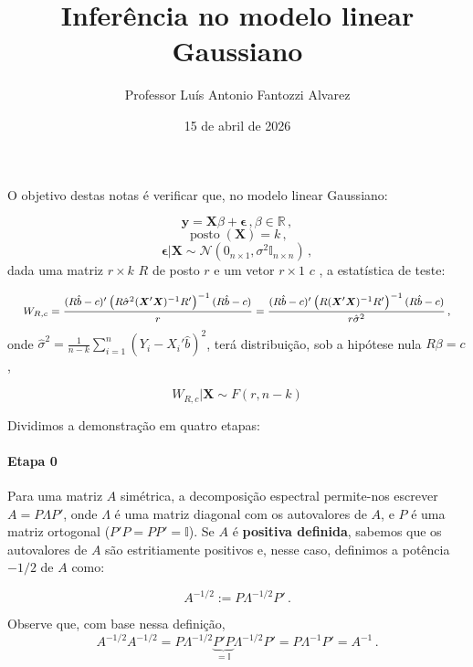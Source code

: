 \documentclass[12pt,a4paper]{article}
\title{Inferência no modelo linear Gaussiano}
\author{ Professor Luís Antonio Fantozzi Alvarez}
\date{15 de abril de 2026}
\begin{document}
	\maketitle
	O objetivo destas notas é verificar que, no modelo linear Gaussiano:
	
	$$\boldsymbol{y} = \boldsymbol{X}\beta + \boldsymbol{\epsilon}\, ,  \beta \in \mathbb{R}\, ,$$
	$$\operatorname{posto}(\boldsymbol{X}) = k\, ,$$
	$$\boldsymbol{\epsilon}|\boldsymbol{X} \sim \mathcal{N}(0_{n\times 1},\sigma^2 \mathbb{I}_{n\times n})\, ,$$
	dada uma matriz $r \times k$ $R$ de posto $r$ e um vetor $r\times 1$ $c$ , a estatística de teste:
	
	$$\footnotesize W_{R,c} = \frac{(R\hat{b}-c)'\left(R\hat{\sigma}^2(\boldsymbol{X}'\boldsymbol{X})^{-1}R'\right)^{-1}(R\hat{b}-c)}{r}  = \frac{(R\hat{b}-c)'\left(R(\boldsymbol{X}'\boldsymbol{X})^{-1}R'\right)^{-1}(R\hat{b}-c)}{r \hat{\sigma}^2}\, ,$$
	onde $\hat{\sigma}^2 = \frac{1}{n-k}\sum_{i=1}^n (Y_i -X_i'\hat{b})^2$, terá distribuição, sob a hipótese nula $R\beta = c$,
	
	$$W_{R,c}|\boldsymbol{X}\sim F(r,n-k)$$
	
	Dividimos a demonstração em quatro etapas:
	
\paragraph{Etapa 0} Para uma matriz $A$ simétrica, a decomposição espectral permite-nos escrever $A = P \Lambda P'$, onde $\Lambda$ é uma matriz diagonal com os autovalores de $A$, e $P$ é uma matriz ortogonal ($P'P=PP'=\mathbb{I}$). Se $A$ é \textbf{positiva definida}, sabemos que os autovalores de $A$ são estritiamente positivos e, nesse caso, definimos a potência $-1/2$ de $A$ como:

$$A^{-1/2}:= P\Lambda^{-1/2}P'\, .$$

Observe que, com base nessa definição, $$A^{-1/2}A^{-1/2} =  P\Lambda^{-1/2}\underbrace{P' P}_{=\mathbb{I}}\Lambda^{-1/2}P' = P\Lambda^{-1}P'=A^{-1}\, .$$
\end{document}

